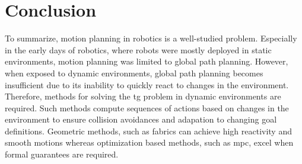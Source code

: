 %

\section{Conclusion}
\label{sec:state_conclusion}

To summarize, motion planning in robotics is a well-studied
problem. Especially in the early days of robotics, where
robots were mostly deployed in static environments, motion
planning was limited to global path planning.
However, when exposed to
dynamic environments, global path planning becomes insufficient due
to its inability to quickly react to changes in the
environment. Therefore, methods for solving the \ac{tg}
problem in dynamic environments are required. Such methods
compute sequences of actions based on changes in the
environment to ensure collision avoidances and adapation to
changing goal definitions. Geometric methods, such as
\ac{fabrics} can achieve high reactivity and smooth motions
whereas optimization based methods, such as \ac{mpc}, excel
when formal guarantees are required.
